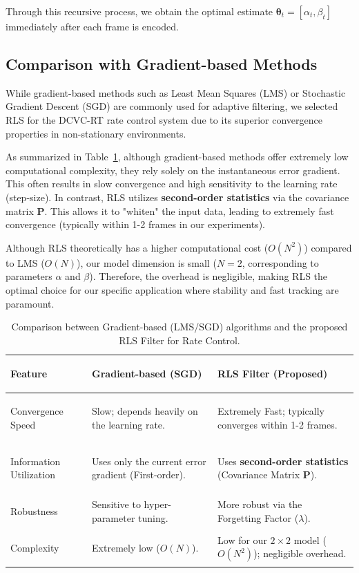 Through this recursive process, we obtain the optimal estimate $\mathbf{\theta}_t = [\alpha_t, \beta_t]$ immediately after each frame is encoded.

\subsection{Comparison with Gradient-based Methods}

While gradient-based methods such as Least Mean Squares (LMS) or Stochastic Gradient Descent (SGD) are commonly used for adaptive filtering, we selected RLS for the DCVC-RT rate control system due to its superior convergence properties in non-stationary environments. 

As summarized in Table~\ref{tab:rls_vs_sgd}, although gradient-based methods offer extremely low computational complexity, they rely solely on the instantaneous error gradient. This often results in slow convergence and high sensitivity to the learning rate (step-size). In contrast, RLS utilizes \textbf{second-order statistics} via the covariance matrix $\mathbf{P}$. This allows it to "whiten" the input data, leading to extremely fast convergence (typically within 1-2 frames in our experiments).

Although RLS theoretically has a higher computational cost ($O(N^2)$) compared to LMS ($O(N)$), our model dimension is small ($N=2$, corresponding to parameters $\alpha$ and $\beta$). Therefore, the overhead is negligible, making RLS the optimal choice for our specific application where stability and fast tracking are paramount.

\begin{table}[h]
    \centering
    \small 
    \renewcommand{\arraystretch}{1.5} 
    \caption{Comparison between Gradient-based (LMS/SGD) algorithms and the proposed RLS Filter for Rate Control.}
    \label{tab:rls_vs_sgd}
    \begin{tabular}{
        >{\bfseries\raggedright\arraybackslash}p{2.5cm} 
        >{\raggedright\arraybackslash}p{5.2cm} 
        >{\raggedright\arraybackslash}p{5.8cm}
    }
        \toprule
        Feature & \textbf{Gradient-based (SGD)} & \textbf{RLS Filter (Proposed)} \\
        \midrule
        Convergence Speed 
        & Slow; depends heavily on the learning rate. 
        & Extremely Fast; typically converges within 1-2 frames. \\
        
        Information Utilization 
        & Uses only the current error gradient (First-order). 
        & Uses \textbf{second-order statistics} (Covariance Matrix $\mathbf{P}$). \\
        
        Robustness 
        & Sensitive to hyper-parameter tuning. 
        & More robust via the Forgetting Factor ($\lambda$). \\
        
        Complexity 
        & Extremely low ($O(N)$). 
        & Low for our $2 \times 2$ model ($O(N^2)$); negligible overhead. \\
        \bottomrule
    \end{tabular}
\end{table}

